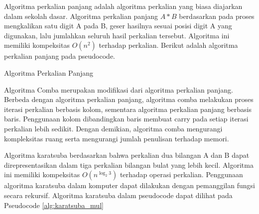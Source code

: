 Algoritma perkalian panjang adalah algoritma perkalian yang biasa diajarkan dalam sekolah dasar. Algoritma perkalian panjang $A*B$ berdasarkan pada proses mengkalikan satu digit A pada B, geser hasilnya sesuai posisi digit A yang digunakan, lalu jumlahkan seluruh hasil perkalian tersebut. Algoritma ini memiliki kompeksitas $O(n^2)$ terhadap perkalian. Berikut adalah algoritma perkalian panjang pada pseudocode.

\begin{algorithm}
  \caption{Algoritma Perkalian Panjang}
    \label{alg:mul}
  \begin{algorithmic}[1]
    \Statex
        \EndFor
      \EndFor
      \State {}
    \EndFunction
  \end{algorithmic}
\end{algorithm}

Algoritma Comba merupakan modifikasi dari algoritma perkalian panjang. Berbeda dengan algoritma perkalian panjang, algoritma comba melakukan proses iterasi perkalian berbasis kolom, sementara algoritma perkalian panjang berbasis baris. Penggunaan kolom dibandingkan baris membuat carry pada setiap iterasi perkalian lebih sedikit. Dengan demikian, algoritma comba mengurangi kompleksitas ruang serta mengurangi jumlah penulisan terhadap memori.

Algoritma karatsuba berdasarkan bahwa perkalian dua bilangan A dan B dapat direpresentasikan dalam tiga perkalian bilangan bulat yang lebih kecil. Algoritma ini memiliki kompeksitas $O(n^{\log_2 3})$ terhadap operasi perkalian. Penggunaan algoritma karatsuba dalam komputer dapat dilakukan dengan pemanggilan fungsi secara rekursif. Algoritma karatsuba dalam pseudocode dapat dilihat pada Pseudocode \ref{alg:karatsuba_mul}

